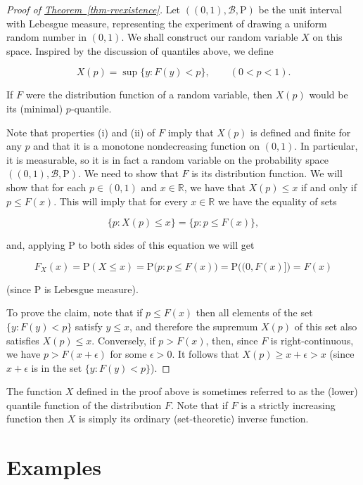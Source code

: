 \documentclass[11pt]{report}
\providecommand{\cal}{\mathcal}
\newcommand{\R}{\mathbb{R}}
\theoremstyle{plain}
\theoremstyle{definition}
\begin{document}
\begin{proof}[Proof of \texorpdfstring{\hyperref[thm-rvexistence]{Theorem~\ref*{thm-rvexistence}}}{Theorem}]
Let $((0,1), {\cal B}, \mathrm{P})$ be the unit
interval with Lebesgue measure, representing the
experiment of drawing a uniform random number in
$(0,1)$. We shall construct our random variable $X$
on this space. Inspired by the discussion of quantiles
above, we define

\[
X(p) = \sup\{ y : F(y) < p \}, \qquad (0<p<1).
\]

\noindent If $F$ were the distribution function of a random
variable, then $X(p)$ would be its (minimal)
$p$-quantile.

Note that properties (i) and (ii) of $F$ imply that
$X(p)$ is defined and finite for any $p$ and that it
is a monotone nondecreasing function on $(0,1)$. In
particular, it is measurable, so it is in fact a
random variable on the probability space
$((0,1), {\cal B}, \mathrm{P})$. We need to show that
$F$ is its distribution function. We will show that
for each $p\in (0,1)$ and $x\in \R$, we have that
$X(p) \le x$ if and only if $p \le F(x)$. This will
imply that for every $x\in \R$ we have the equality
of sets

\[
\{ p : X(p) \le x \} = \{ p : p \le F(x) \},
\]

\noindent and, applying $\mathrm{P}$ to both sides of this
equation we will get

\[
F_X(x) = \mathrm{P}(X\le x) = \mathrm{P}\big( p : p \le F(x) \big) = \mathrm{P}\big( (0,F(x)] \big)
= F(x)
\]

\noindent (since $\mathrm{P}$ is Lebesgue measure).

To prove the claim, note that if $p \le F(x)$ then
all elements of the set $\{ y : F(y) < p\}$ satisfy
$y\le x$, and therefore the supremum $X(p)$ of this
set also satisfies $X(p) \le x$. Conversely, if
$p > F(x)$, then, since $F$ is right-continuous, we
have $p > F(x+\epsilon)$ for some $\epsilon>0$. It
follows that $X(p)\ge x+\epsilon>x$ (since
$x+\epsilon$ is in the set $\{ y : F(y)<p \}$).
\end{proof}

\noindent The function $X$ defined in the proof above is
sometimes referred to as the (lower) quantile function
of the distribution $F$. Note that if $F$ is a
strictly increasing function then $X$ is simply its
ordinary (set-theoretic) inverse function.

\section{Examples}
\end{document}

